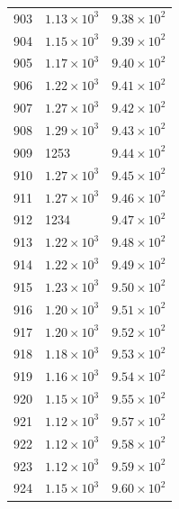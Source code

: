 \begin{table}[H]
\begin{tabular}{lll}
903 & $\displaystyle 1.13 \times 10^{3}$ & $\displaystyle 9.38 \times 10^{2}$ \\
904 & $\displaystyle 1.15 \times 10^{3}$ & $\displaystyle 9.39 \times 10^{2}$ \\
905 & $\displaystyle 1.17 \times 10^{3}$ & $\displaystyle 9.40 \times 10^{2}$ \\
906 & $\displaystyle 1.22 \times 10^{3}$ & $\displaystyle 9.41 \times 10^{2}$ \\
907 & $\displaystyle 1.27 \times 10^{3}$ & $\displaystyle 9.42 \times 10^{2}$ \\
908 & $\displaystyle 1.29 \times 10^{3}$ & $\displaystyle 9.43 \times 10^{2}$ \\
909 & 1253 & $\displaystyle 9.44 \times 10^{2}$ \\
910 & $\displaystyle 1.27 \times 10^{3}$ & $\displaystyle 9.45 \times 10^{2}$ \\
911 & $\displaystyle 1.27 \times 10^{3}$ & $\displaystyle 9.46 \times 10^{2}$ \\
912 & 1234 & $\displaystyle 9.47 \times 10^{2}$ \\
913 & $\displaystyle 1.22 \times 10^{3}$ & $\displaystyle 9.48 \times 10^{2}$ \\
914 & $\displaystyle 1.22 \times 10^{3}$ & $\displaystyle 9.49 \times 10^{2}$ \\
915 & $\displaystyle 1.23 \times 10^{3}$ & $\displaystyle 9.50 \times 10^{2}$ \\
916 & $\displaystyle 1.20 \times 10^{3}$ & $\displaystyle 9.51 \times 10^{2}$ \\
917 & $\displaystyle 1.20 \times 10^{3}$ & $\displaystyle 9.52 \times 10^{2}$ \\
918 & $\displaystyle 1.18 \times 10^{3}$ & $\displaystyle 9.53 \times 10^{2}$ \\
919 & $\displaystyle 1.16 \times 10^{3}$ & $\displaystyle 9.54 \times 10^{2}$ \\
920 & $\displaystyle 1.15 \times 10^{3}$ & $\displaystyle 9.55 \times 10^{2}$ \\
921 & $\displaystyle 1.12 \times 10^{3}$ & $\displaystyle 9.57 \times 10^{2}$ \\
922 & $\displaystyle 1.12 \times 10^{3}$ & $\displaystyle 9.58 \times 10^{2}$ \\
923 & $\displaystyle 1.12 \times 10^{3}$ & $\displaystyle 9.59 \times 10^{2}$ \\
924 & $\displaystyle 1.15 \times 10^{3}$ & $\displaystyle 9.60 \times 10^{2}$ \\

\end{tabular}
\end{table}
